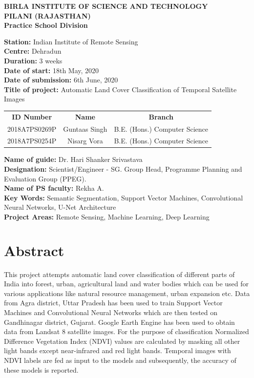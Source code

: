 \documentclass[12pt, a4paper]{report}
\begin{document}
\begin{center}  
\textbf {BIRLA INSTITUTE OF SCIENCE AND TECHNOLOGY\\
PILANI (RAJASTHAN)\\
Practice School Division}
\end{center}
\begin{onehalfspace}
\textbf{Station:} Indian Institute of Remote Sensing \\
\textbf{Centre:} Dehradun\\
\textbf{Duration:} 3 weeks\\
\textbf{Date of start:} 18th May, 2020 \\
\textbf{Date of submission:} 6th June, 2020 \\
\textbf{Title of project:} Automatic Land Cover Classification of Temporal Satellite Images
\begin{center}
\begin{tabular}{c c c}
\textbf{ID Number} & \textbf{Name} & \textbf{Branch} \\
2018A7PS0269P & Guntaas Singh & B.E. (Hons.) Computer Science \\
2018A7PS0254P & Nisarg Vora  & B.E. (Hons.) Computer Science \\
\end{tabular} 
\end{center}
\textbf{Name of guide:} Dr. Hari Shanker Srivastava \\
\textbf{Designation:} Scientist/Engineer - SG. Group Head, Programme Planning and Evaluation Group (PPEG). \\
\textbf{Name of PS faculty:} Rekha A. \\
\textbf{Key Words:} Semantic Segmentation, Support Vector Machines, Convolutional Neural Networks, U-Net Architecture\\
\textbf{Project Areas:} Remote Sensing, Machine Learning, Deep Learning
\section{Abstract}
\paragraph{}
This project attempts automatic land cover classification of different parts of India into forest, urban, agricultural land and water bodies which can be used for various applications like natural resource management, urban expansion etc.  Data from Agra district, Uttar Pradesh has been used to train Support Vector Machines and Convolutional Neural Networks which are then tested on Gandhinagar district, Gujarat. Google Earth Engine has been used to obtain data from Landsat 8 satellite images. For the purpose of classification Normalized Difference Vegetation Index (NDVI) values are calculated by masking all other light bands except near-infrared and red light bands. Temporal images with NDVI labels are fed as input to the models and subsequently, the accuracy of these models is reported.
\end{onehalfspace}
\newpage
\end{document}
